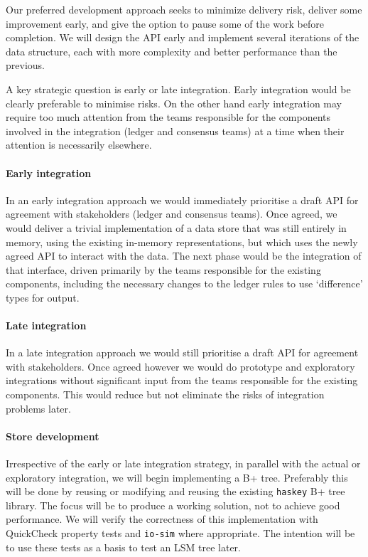 \documentclass[11pt,a4paper]{article}
\begin{document}
Our preferred development approach seeks to minimize delivery risk, deliver
some improvement early, and give the option to pause some of the work before
completion. We will design the API early and implement several iterations of
the data structure, each with more complexity and better performance than the
previous.

A key strategic question is early or late integration. Early integration would
be clearly preferable to minimise risks. On the other hand early integration
may require too much attention from the teams responsible for the components
involved in the integration (ledger and consensus teams) at a time when their
attention is necessarily elsewhere.

\paragraph{Early integration} In an early integration approach we would
immediately prioritise a draft API for agreement with stakeholders (ledger
and consensus teams). Once agreed, we would deliver a trivial implementation of
a data store that was still entirely in memory, using the existing in-memory
representations, but which uses the newly agreed API to interact with the data.
The next phase would be the integration of that interface, driven primarily by
the teams responsible for the existing components, including the necessary
changes to the ledger rules to use `difference' types for output.

\paragraph{Late integration} In a late integration approach we would still
prioritise a draft API for agreement with stakeholders. Once agreed however we
would do prototype and exploratory integrations without significant input from
the teams responsible for the existing components. This would reduce but not
eliminate the risks of integration problems later.

\paragraph{Store development}
Irrespective of the early or late integration strategy, in parallel with the
actual or exploratory integration, we will begin implementing a B+ tree.
Preferably this will be done by reusing or modifying and reusing the existing
{\tt haskey} B+ tree library. The focus will be to produce a working solution,
not to achieve good performance. We will verify the correctness of this
implementation with QuickCheck property tests and {\tt io-sim} where
appropriate. The intention will be to use these tests as a basis to test an LSM
tree later.
\end{document}

